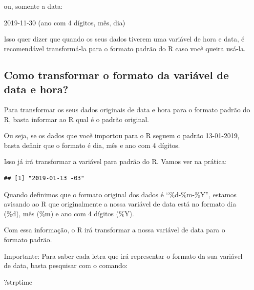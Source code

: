 \documentclass[
]{book}
\newenvironment{Shaded}{\begin{snugshade}}{\end{snugshade}}
\newcommand{\DataTypeTok}[1]{\textcolor[rgb]{0.13,0.29,0.53}{#1}}
\newcommand{\KeywordTok}[1]{\textcolor[rgb]{0.13,0.29,0.53}{\textbf{#1}}}
\newcommand{\NormalTok}[1]{#1}
\newcommand{\StringTok}[1]{\textcolor[rgb]{0.31,0.60,0.02}{#1}}
\begin{document}
ou, somente a data:

2019-11-30 (ano com 4 dígitos, mês, dia)

Isso quer dizer que quando os seus dados tiverem uma variável de hora e
data, é recomendável transformá-la para o formato padrão do R caso você
queira usá-la.

\hypertarget{como-transformar-o-formato-da-variuxe1vel-de-data-e-hora}{%
\subsection{Como transformar o formato da variável de data e
hora?}\label{como-transformar-o-formato-da-variuxe1vel-de-data-e-hora}}

Para transformar os seus dados originais de data e hora para o formato
padrão do R, basta informar ao R qual é o padrão original.

Ou seja, se os dados que você importou para o R seguem o padrão
13-01-2019, basta definir que o formato é dia, mês e ano com 4 dígitos.

Isso já irá transformar a variável para padrão do R. Vamos ver na
prática:

\begin{Shaded}
\end{Shaded}

\begin{verbatim}
## [1] "2019-01-13 -03"
\end{verbatim}

Quando definimos que o formato original dos dados é ``\%d-\%m-\%Y'',
estamos avisando ao R que originalmente a nossa variável de data está no
formato dia (\%d), mês (\%m) e ano com 4 dígitos (\%Y).

Com essa informação, o R irá transformar a nossa variável de data para o
formato padrão.

Importante: Para saber cada letra que irá representar o formato da sua
variável de data, basta pesquisar com o comando:

\begin{Shaded}
\begin{Highlighting}[]
\NormalTok{?strptime}
\end{Highlighting}
\end{Shaded}
\end{document}
